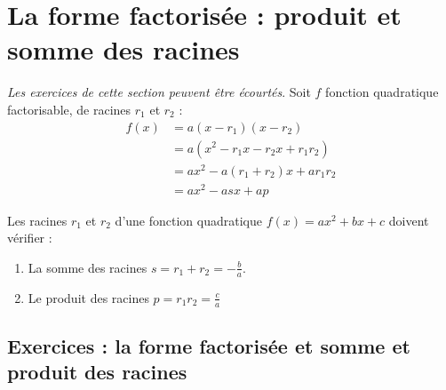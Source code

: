 \documentclass[main.tex]{subfiles}
\begin{document}
\section{La forme factorisée : produit et somme des racines}
\emph{Les exercices de cette section peuvent être écourtés}.
Soit $f$ fonction quadratique factorisable, de racines $r_1$ et $r_2$ :
\begin{align*}
	f(x)& = a(x-r_1)(x-r_2) \\
	& = a (x^2- r_1x -r_2x + r_1r_2)\\
	& = ax^2 - a(r_1+r_2) x + ar_1r_2 \\
	& = ax^2- a sx + ap
\end{align*}
\begin{theorem} Les racines $r_1$ et $r_2$ d'une fonction quadratique $f(x)=ax^2+bx+c$ doivent vérifier :
	\begin{enumerate}[leftmargin=*,label=\textbullet]
		\item La somme des racines $s = r_1+r_2= -\frac{b}{a}$.
		\item Le produit des racines $p=r_1r_2= \frac{c}{a}$
	\end{enumerate} 
\end{theorem}
\newpage 
{}  
\pagestyle{scrheadings} %
\onehalfspacing
\subsection{Exercices : la forme factorisée et somme et produit des racines}
\end{document}
